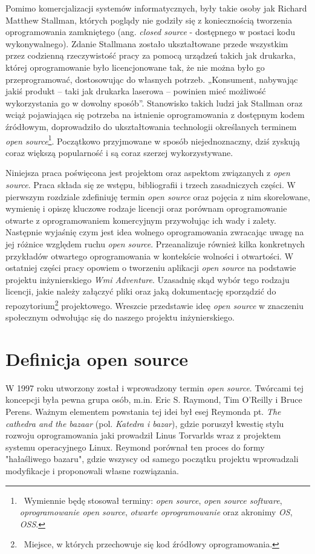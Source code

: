 \documentclass{article}
\begin{document}
Pomimo komercjalizacji systemów informatycznych, były takie osoby jak Richard Matthew Stallman, których poglądy nie godziły się z koniecznością tworzenia oprogramowania zamkniętego (ang. \emph{closed source} - dostępnego w postaci kodu wykonywalnego). Zdanie Stallmana zostało ukształtowane przede wszystkim przez codzienną rzeczywistość pracy za pomocą urządzeń takich jak drukarka, której oprogramowanie było licencjonowane tak, że nie można było go przeprogramować, dostosowując do własnych potrzeb. „Konsument, nabywając jakiś produkt – taki jak drukarka laserowa – powinien mieć możliwość wykorzystania go w dowolny sposób”\cite{Kotula}. Stanowisko takich ludzi jak Stallman oraz wciąż pojawiająca się potrzeba na istnienie oprogramowania z dostępnym kodem źródłowym, doprowadziło do ukształtowania technologii określanych terminem \emph{open source}\footnote{\, Wymiennie będę stosował terminy: \emph{open source}, \emph{open source software}, \emph{oprogramowanie open source}, \emph{otwarte oprogramowanie} oraz akronimy \emph{OS}, \emph{OSS}.}. Początkowo przyjmowane w sposób niejednoznaczny, dziś zyskują coraz większą popularność i są coraz szerzej wykorzystywane\cite{Kotula}. 

Niniejsza praca poświęcona jest projektom oraz aspektom związanych z \emph{open source}. Praca składa się ze wstępu, bibliografii i trzech zasadniczych części. W pierwszym rozdziale zdefiniuję termin \emph{open source} oraz pojęcia z nim skorelowane, wymienię i opiszę kluczowe rodzaje licencji oraz porównam oprogramowanie otwarte z oprogramowaniem komercyjnym przywołując ich wady i zalety. Następnie wyjaśnię czym jest idea wolnego oprogramowania zwracając uwagę na jej różnice względem ruchu \emph{open source}. Przeanalizuje również kilka konkretnych przykładów otwartego oprogramowania w kontekście wolności i otwartości. W ostatniej części pracy opowiem o tworzeniu aplikacji \emph{open source} na podstawie projektu inżynierskiego \emph{Wmi Adventure}. Uzasadnię skąd wybór tego rodzaju licencji, jakie należy załączyć pliki oraz jaką dokumentację sporządzić do repozytorium\footnote{\, Miejsce, w których przechowuje się kod źródłowy oprogramowania.} projektowego. Wreszcie przedstawie ideę \emph{open source} w znaczeniu społecznym odwołując się do naszego projektu inżynierskiego.

\section{Definicja open source}

\hspace{4mm} W 1997 roku utworzony został i wprowadzony termin \emph{open source}. Twórcami tej koncepcji była pewna grupa osób, m.in. Eric S. Raymond, Tim O'Reilly i Bruce Perens. Ważnym elementem powstania tej idei był esej Reymonda pt. \emph{The cathedra and the bazaar} (pol. \emph{Katedra i bazar}), gdzie poruszył kwestię stylu rozwoju oprogramowania jaki prowadził Linus Torvarlds wraz z projektem systemu operacyjnego Linux. Reymond porównał ten proces do formy "hałaśliwego bazaru", gdzie wszyscy od samego początku projektu wprowadzali modyfikacje i proponowali własne rozwiązania\cite{Kotula}.  
\end{document}
